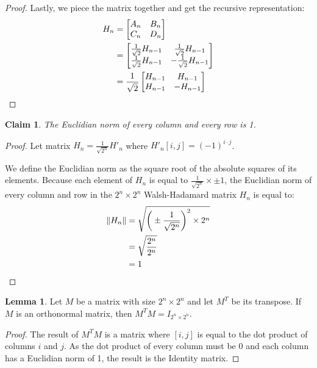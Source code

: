\documentclass[11pt]{article}
\theoremstyle{definition}
\newtheorem{lemma}{Lemma}
\theoremstyle{plain}
\newtheorem{claim}{Claim}
\theoremstyle{indented-remark}
\theoremstyle{indented-proof}
\begin{document}
\begin{proof}
\noindent Lastly, we piece the matrix together and get the recursive representation:
\begin{align}
H_{n} &=
\begin{bmatrix} 
A_{n} & B_{n} \\
C_{n} & D_{n} 
\end{bmatrix}\notag \\
&=
\begin{bmatrix} 
\frac{1}{\sqrt{2}}H_{n-1} & \frac{1}{\sqrt{2}}H_{n-1} \\
\frac{1}{\sqrt{2}}H_{n-1} & - \frac{1}{\sqrt{2}}H_{n-1} 
\end{bmatrix}\notag \\
&= \frac{1}{\sqrt{2}}
\begin{bmatrix} 
H_{n-1} & H_{n-1} \\
H_{n-1} & -H_{n-1} 
\end{bmatrix}\notag
\end{align}
\end{proof}

\newpage

\begin{claim}
The Euclidian norm of every column and every row is 1.
\end{claim}

\begin{proof}
Let matrix $H_{n} = \frac{1}{\sqrt{2^{n}}} H'_{n}$ where $H'_{n}[i,j] = (-1)^{i \cdot j}$. 
\newline

\noindent We define the Euclidian norm as the square root of the absolute squares of its elements. Because each element of $H_{n}$ is equal to $\frac{1}{\sqrt{2^{n}}} \times \pm 1$, the Euclidian norm of every column and row in the $2^{n} \times 2^{n}$ Walsh-Hadamard matrix $H_{n}$ is equal to:
\begin{align}
\| H_{n} \| &= \sqrt{\bigg( \pm \frac{1}{\sqrt{2^{n}}} \bigg) ^{2} \times 2^{n}}\notag \\
&= \sqrt{\frac{2^{n}}{2^{n}}}\notag \\
&= 1\notag
\end{align}
\end{proof}

\newpage

\begin{lemma}
Let $M$ be a matrix with size $2^{n} \times 2^{n}$ and let $M^{T}$ be its transpose. If $M$ is an orthonormal matrix, then $M^{T}M = I_{2^{n} \times 2^{n}}$.
\begin{proof}
The result of $M^{T}M$ is a matrix where $[i,j]$ is equal to the dot product of columns $i$ and $j$. As the dot product of every column must be 0 and each column has a Euclidian norm of 1, the result is the Identity matrix.
\end{proof}
\end{lemma}
\end{document}
